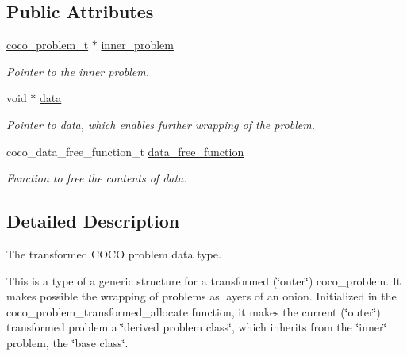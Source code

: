 \subsection*{Public Attributes}
\begin{DoxyCompactItemize}
\item 
\hyperlink{structcoco__problem__s}{coco\+\_\+problem\+\_\+t} $\ast$ \hyperlink{structcoco__problem__transformed__data__t_ae857b926cab924dd7bf4cd909105dfce}{inner\+\_\+problem}\hypertarget{structcoco__problem__transformed__data__t_ae857b926cab924dd7bf4cd909105dfce}{}\label{structcoco__problem__transformed__data__t_ae857b926cab924dd7bf4cd909105dfce}

\begin{DoxyCompactList}\small\item\em Pointer to the inner problem. \end{DoxyCompactList}\item 
void $\ast$ \hyperlink{structcoco__problem__transformed__data__t_a217318c83ec7450ded138c45dd0c8eff}{data}\hypertarget{structcoco__problem__transformed__data__t_a217318c83ec7450ded138c45dd0c8eff}{}\label{structcoco__problem__transformed__data__t_a217318c83ec7450ded138c45dd0c8eff}

\begin{DoxyCompactList}\small\item\em Pointer to data, which enables further wrapping of the problem. \end{DoxyCompactList}\item 
coco\+\_\+data\+\_\+free\+\_\+function\+\_\+t \hyperlink{structcoco__problem__transformed__data__t_ac848c6b4ba534992a979130485db34ca}{data\+\_\+free\+\_\+function}\hypertarget{structcoco__problem__transformed__data__t_ac848c6b4ba534992a979130485db34ca}{}\label{structcoco__problem__transformed__data__t_ac848c6b4ba534992a979130485db34ca}

\begin{DoxyCompactList}\small\item\em Function to free the contents of data. \end{DoxyCompactList}\end{DoxyCompactItemize}


\subsection{Detailed Description}
The transformed C\+O\+CO problem data type. 

This is a type of a generic structure for a transformed (\char`\"{}outer\char`\"{}) coco\+\_\+problem. It makes possible the wrapping of problems as layers of an onion. Initialized in the coco\+\_\+problem\+\_\+transformed\+\_\+allocate function, it makes the current (\char`\"{}outer\char`\"{}) transformed problem a \char`\"{}derived problem class\char`\"{}, which inherits from the \char`\"{}inner\char`\"{} problem, the \char`\"{}base class\char`\"{}.

